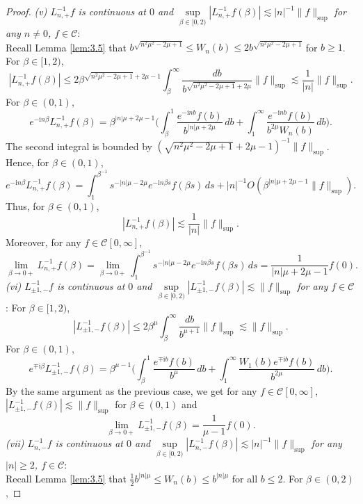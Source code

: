 \documentclass[10pt,a4paper]{amsart}
\newcommand{\mcal}{\mathcal}
\newcommand{\norm}[1]{\lVert #1 \rVert}
\begin{document}
\begin{proof}
\textit{(v) $L_{n,+}^{-1} f$ is continuous at $0$ and $\underset{\beta\in[0,2)}{\sup} |L_{n,+}^{-1} f(\beta)| \lesssim |n|^{-1} \norm{f}_{\sup}$ for any $n\neq 0$, $f\in \mcal{C}$}:\\
Recall Lemma \ref{lem:3.5} that $b^{\sqrt{n^2\mu^2 - 2\mu + 1}} \leq W_n(b) \leq 2 b^{\sqrt{n^2\mu^2 - 2\mu + 1}}$ for $b\geq 1$. For $\beta \in [1,2)$,
\[ |L_{n,+}^{-1} f(\beta)| \leq 2\beta^{\sqrt{n^2\mu^2 - 2\mu + 1} +2\mu -1} \int_\beta^\infty \frac{db}{b^{\sqrt{n^2 \mu^2 - 2\mu + 1}+2\mu }} \norm{f}_{\sup} \lesssim \frac{1}{|n|} \norm{f}_{\sup}.\]
For $\beta \in (0,1)$,
\[e^{-\textrm{i}n \beta} L_{n,+}^{-1} f(\beta) = \beta^{|n|\mu + 2\mu - 1} \bigg(\int_\beta^1 \frac{e^{-\textrm{i}n b} f(b)}{b^{|n|\mu + 2\mu}} \,db  + \int_1^\infty \frac{e^{-\textrm{i}n b} f(b)}{b^{2\mu} W_n(b)} \,db \bigg).\]
The second integral is bounded by $(\sqrt{n^2 \mu^2 - 2\mu + 1}+2\mu -1)^{-1} \norm{f}_{\sup}$. Hence, for $\beta\in (0,1)$,
\[e^{-\textrm{i}n \beta} L_{n,+}^{-1} f(\beta) = \int_1^{\beta^{-1}} s^{-|n|\mu - 2\mu} e^{-\textrm{i}n \beta s} f(\beta s) \,ds + |n|^{-1} O(\beta^{|n|\mu + 2\mu - 1} \norm{f}_{\sup}).\]
Thus, for $\beta\in (0,1)$,
\[|L_{n,+}^{-1} f(\beta)| \lesssim \frac{1}{|n|} \norm{f}_{\sup}.\]
Moreover, for any $f\in\mcal{C}[0,\infty]$,
\[\lim_{\beta \to 0+} L_{n,+}^{-1} f(\beta) = \lim_{\beta \to 0+} \int_1^{\beta^{-1}} s^{-|n|\mu - 2\mu} e^{-\textrm{i}n \beta s} f(\beta s) \,ds = \frac{1}{|n|\mu + 2\mu - 1} f(0).\]
\textit{(vi) $L_{\pm 1, -}^{-1} f$ is continuous at $0$ and $\underset{\beta\in[0,2)}{\sup} |L_{\pm 1,-}^{-1} f(\beta)| \lesssim \norm{f}_{\sup}$ for any $f\in\mcal{C}$}: For $\beta \in [1,2)$,
\[|L_{\pm 1, -}^{-1} f(\beta)| \leq 2\beta^\mu \int_\beta^\infty \frac{db}{b^{\mu + 1}} \norm{f}_{\sup} \lesssim \norm{f}_{\sup}.\]
For $\beta \in (0,1)$,
\[e^{\mp \textrm{i}\beta} L_{\pm 1, -}^{-1} f(\beta) = \beta^{\mu - 1} \bigg( \int_\beta^1 \frac{e^{\mp\textrm{i}b} f(b)}{b^\mu} \,db + \int_1^\infty \frac{W_1(b) e^{\mp\textrm{i}b} f(b)}{b^{2\mu}} \,db \bigg).\]
By the same argument as the previous case, we get for any $f\in \mcal{C}[0,\infty]$, $|L_{\pm 1, -}^{-1} f(\beta)| \lesssim \norm{f}_{\sup}$ for $\beta \in (0,1)$ and
\[\lim_{\beta \to 0+} L_{\pm 1, -}^{-1} f(\beta) = \frac{1}{\mu - 1} f(0).\]
\textit{(vii) $L_{n,-}^{-1} f$ is continuous at $0$ and $\underset{\beta\in[0,2)}{\sup} |L^{-1}_{n,-} f(\beta)| \lesssim |n|^{-1} \norm{f}_{\sup}$ for any $|n|\geq 2$, $f\in\mcal{C}$}:\\
Recall Lemma \ref{lem:3.5} that $\frac{1}{2} b^{|n|\mu} \leq W_n(b) \leq b^{|n|\mu}$ for all $b\leq 2$. For $\beta \in (0,2)$,

\end{proof}
\end{document}
